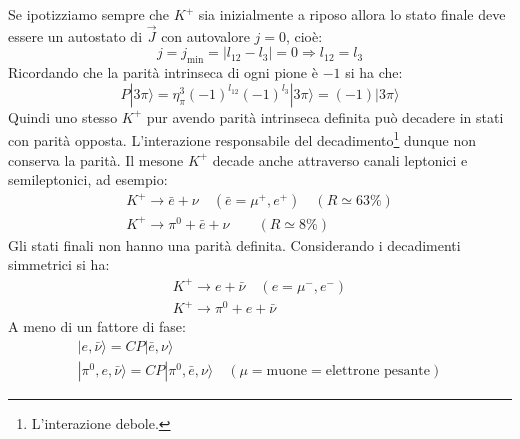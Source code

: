 Se ipotizziamo sempre che $K^+$ sia inizialmente a riposo allora lo stato finale deve essere un autostato di
$\vec{J}$ con autovalore $j=0$, cioè:
\[
j=j_{\text{min}}=|l_{12}-l_3|=0\Rightarrow l_{12}=l_3
\]
Ricordando che la parità intrinseca di ogni pione è $-1$ si ha che:
\[
P|3\pi\rangle=\eta_{\pi}^3(-1)^{l_{12}}(-1)^{l_3}|3\pi\rangle=(-1)|3\pi\rangle
\]
Quindi uno stesso $K^+$ pur avendo parità intrinseca definita può decadere in stati con parità opposta.
L'interazione responsabile del decadimento\footnote{L'interazione debole.} dunque non conserva la parità.
Il mesone $K^+$ decade anche attraverso canali leptonici e semileptonici, ad esempio:
\begin{gather}
K^+\rightarrow \bar{e}+\nu\quad(\bar{e}=\mu^+,e^+)\quad(R\simeq 63\%)\\
K^+\rightarrow \pi^0+\bar{e}+\nu\qquad(R\simeq 8\%)
\end{gather}
Gli stati finali non hanno una parità definita. Considerando i decadimenti simmetrici si ha:
\begin{gather}
K^+\rightarrow e+\bar{\nu}\quad(e=\mu^-,e^-)\\
K^+\rightarrow \pi^0+e+\bar{\nu}
\end{gather}
A meno di un fattore di fase:
\begin{gather}
|e,\bar{\nu}\rangle =CP|\bar{e},\nu\rangle\\
|\pi^0,e,\bar{\nu}\rangle =CP|\pi^0,\bar{e},\nu\rangle\quad(\mu=\text{muone}=\text{elettrone pesante})
\end{gather}

